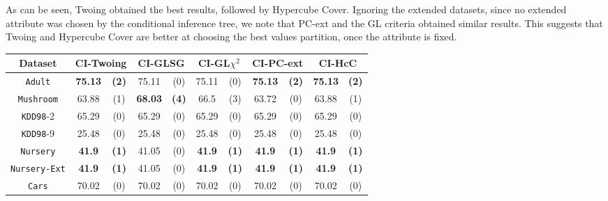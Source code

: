 As can be seen, Twoing obtained the best results, followed by Hypercube Cover. Ignoring the extended datasets, since no extended attribute was chosen by the conditional inference tree, we note that PC-ext and the GL criteria obtained similar results. This suggests that Twoing and Hypercube Cover are better at choosing the best values partition, once the attribute is fixed.


\begin{table*}
\small
\centering
\begin{tabular}{c|cc|cc|cc|cc|cc} 
Dataset  &   \multicolumn{2}{c|}{CI-Twoing} &   \multicolumn{2}{c|}{CI-GLSG} & \multicolumn{2}{c|}{CI-GL$\chi^2$}& \multicolumn{2}{c|}{CI-PC-ext}& \multicolumn{2}{c}{CI-HcC} \\  \hline   
{\tt Adult}        &{\bf 75.13} & {\bf (2)} & 75.11       & (0)       & 75.11       & (0)       & {\bf 75.13} & {\bf (2)} & {\bf 75.13} & {\bf (2)} \\
{\tt Mushroom}     &63.88       & (1)       &{\bf 68.03 } & {\bf (4)} & 66.5        & (3)       & 63.72       & (0)       & 63.88       & (1)       \\
{\tt KDD98}-2      &65.29       & (0)       & 65.29       & (0)       & 65.29       & (0)       & 65.29       & (0)       & 65.29       & (0)       \\
{\tt KDD98}-9      &25.48       & (0)       & 25.48       & (0)       & 25.48       & (0)       & 25.48       & (0)       & 25.48       & (0)       \\
{\tt Nursery}      &{\bf 41.9}  & {\bf (1)} & 41.05       & (0)       & {\bf 41.9}  & {\bf (1)} & {\bf 41.9}  & {\bf (1)} & {\bf 41.9}  & {\bf (1)} \\
{\tt Nursery-Ext}  &{\bf 41.9}  & {\bf (1)} & 41.05       & (0)       & {\bf 41.9}  & {\bf (1)} & {\bf 41.9}  & {\bf (1)} & {\bf 41.9}  & {\bf (1)} \\
{\tt Cars}         &70.02       & (0)       & 70.02       & (0)       & 70.02       & (0)       & 70.02       & (0)       & 70.02       & (0)       \\

\end{tabular}
\end{table*}
